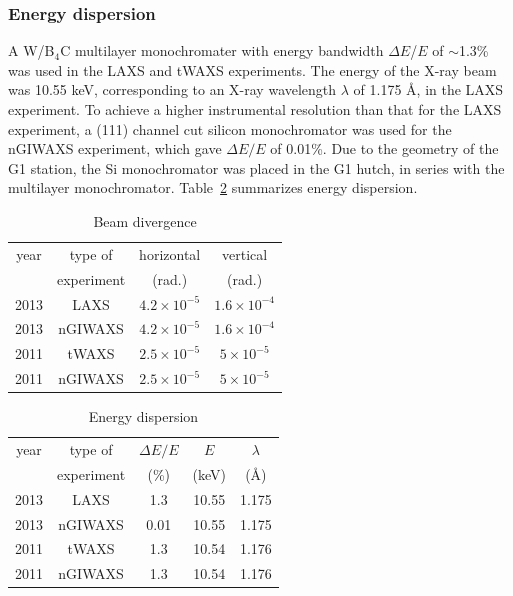 \subsubsection{Energy dispersion}\label{sec:energy_dispersion}
A W/B$_4$C multilayer monochromater with energy bandwidth $\Delta E$/$E$ of
$\sim$1.3\% was used in the LAXS and tWAXS experiments. 
The energy of the X-ray beam was 10.55 keV, corresponding to an X-ray wavelength 
$\lambda$ of 1.175 \AA, in the LAXS experiment.
To achieve a higher instrumental resolution than that for 
the LAXS experiment, a (111) channel cut silicon monochromator was used for 
the nGIWAXS experiment, which gave $\Delta E/E$ of 0.01\%.
Due to the geometry of the G1 station, the Si monochromator was placed in
the G1 hutch, in series with the multilayer monochromator. 
Table~\ref{tab:energy_dispersion} summarizes energy dispersion.

\begin{table}[htbp]
  \centering
  \begin{tabular}{cccc}
    \hline
    year & type of  & horizontal & vertical \\
     & experiment & (rad.) & (rad.) \\
    \hline
    2013 & LAXS & $4.2 \times 10^{-5}$ & $1.6 \times 10^{-4}$ \\
    2013 & nGIWAXS & $4.2 \times 10^{-5}$ & $1.6 \times 10^{-4}$ \\
    2011 & tWAXS & $2.5 \times 10^{-5}$ & $5 \times 10^{-5}$ \\
    2011 & nGIWAXS & $2.5 \times 10^{-5}$ & $5 \times 10^{-5}$ \\
    \hline
  \end{tabular}
  \caption[Beam divergence]{Beam divergence}
  \label{tab:beam_divergence}
\end{table}

\begin{table}[htbp]
  \centering
  \begin{tabular}{ccccc}
    \hline
    year & type of & $\Delta E/E$ & $E$ & $\lambda$ \\
     & experiment & (\%) & (keV) & (\AA) \\
    \hline
    2013 & LAXS & 1.3 & 10.55 & 1.175 \\
    2013 & nGIWAXS & 0.01 & 10.55 & 1.175 \\
    2011 & tWAXS & 1.3 & 10.54 & 1.176 \\
    2011 & nGIWAXS & 1.3 & 10.54 & 1.176 \\
    \hline
  \end{tabular}
  \caption[Energy dispersion]{Energy dispersion}
  \label{tab:energy_dispersion}
\end{table}

